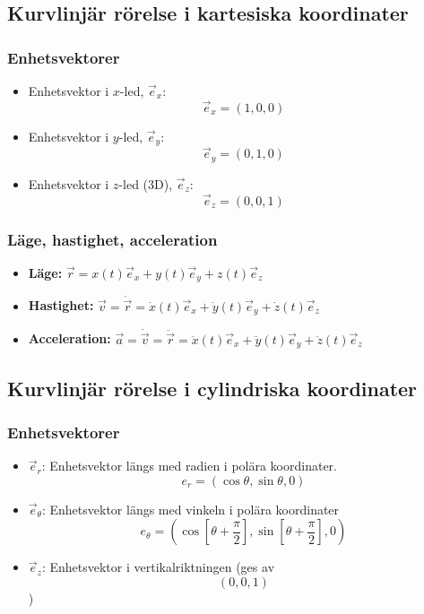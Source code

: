 \documentclass{article}
\begin{document}
\begin{paracol}{2}
\subsection{Kurvlinjär rörelse i kartesiska koordinater}
\subsubsection{Enhetsvektorer}
\begin{itemize}
    \item Enhetsvektor i $x$-led, $\vec e_x$:
    $$\vec e_x = (1,0,0)$$
    \item Enhetsvektor i $y$-led, $\vec e_y$:
    $$\vec e_y = (0,1,0)$$
    \item Enhetsvektor i $z$-led (3D), $\vec e_z$:
    $$\vec e_z = (0,0,1)$$ 
\end{itemize}
\subsubsection{Läge, hastighet, acceleration}
\begin{itemize}
    \item \textbf{Läge:} $\vec r = x(t)\vec e_x + y(t)\vec e_y + z(t)\vec e_z$
    \item \textbf{Hastighet:} $\vec v = \dot{\vec r} = \dot x(t)\vec e_x + \dot y(t)\vec e_y + \dot z(t)\vec e_z$
    \item \textbf{Acceleration:} $\vec a = \dot{\vec v} = \ddot{\vec r} = \ddot x(t)\vec e_x + \ddot y(t)\vec e_y + \ddot z(t)\vec e_z$
\end{itemize}

\subsection{Kurvlinjär rörelse i cylindriska koordinater}
\subsubsection{Enhetsvektorer}

\begin{itemize}
    \item $\vec e_r$: Enhetsvektor längs med radien i polära koordinater.
    $$e_r = (\cos \theta, \sin \theta, 0)$$
    \item $\vec e_\theta$: Enhetsvektor längs med vinkeln i polära koordinater
    $$e_\theta = (\cos \left[\theta + \frac{\pi}{2}\right], \sin \left[\theta + \frac{\pi}{2}\right], 0)$$
    \item $\vec e_z$: Enhetsvektor i vertikalriktningen (ges av $$(0,0,1)$$)
\end{itemize}

\end{paracol}
\end{document}
